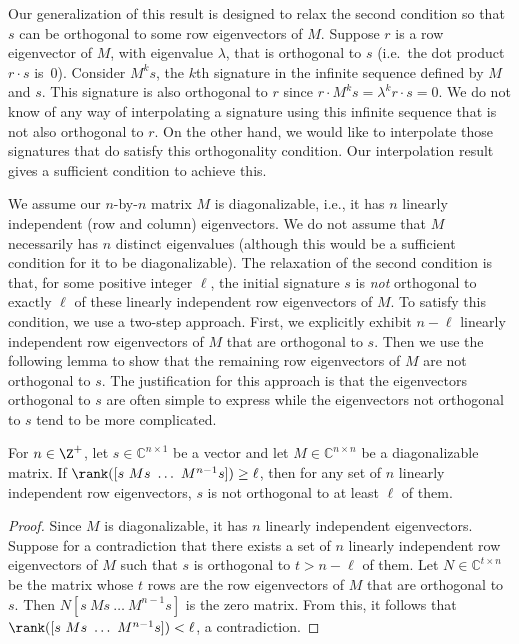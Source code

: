 \documentclass[11pt]{article}
\begin{document}
Our generalization of this result is designed to relax the second condition so that $s$ can be orthogonal to some row eigenvectors of $M$.
Suppose $r$ is a row eigenvector of $M$, with eigenvalue $\lambda$, that is orthogonal to $s$ (i.e.~the dot product $r \cdot s$ is~$0$).
Consider $M^k s$, the $k$th signature in the infinite sequence defined by $M$ and $s$.
This signature is also orthogonal to $r$ since $r \cdot M^k s = \lambda^k r \cdot s = 0$.
We do not know of any way of interpolating a signature using this infinite sequence that is not also orthogonal to $r$.
On the other hand,
we would like to interpolate those signatures that do satisfy this orthogonality condition.
Our interpolation result gives a sufficient condition to achieve this.

We assume our $n$-by-$n$ matrix $M$ is diagonalizable,
i.e., it has $n$ linearly independent (row and column) eigenvectors.
We do not assume that $M$ necessarily has $n$ distinct eigenvalues (although this would be a sufficient condition for it to be diagonalizable).
The relaxation of the second condition is that, for some positive integer $\ell$,
the initial signature $s$ is \emph{not} orthogonal to exactly $\ell$ of these linearly independent row eigenvectors of $M$.
To satisfy this condition,
we use a two-step approach.
First, we explicitly exhibit $n - \ell$ linearly independent row eigenvectors of $M$ that are orthogonal to $s$.
Then we use the following lemma to show that the remaining row eigenvectors of $M$ are not orthogonal to $s$.
The justification for this approach is that the eigenvectors orthogonal to $s$ are often simple to express
while the eigenvectors not orthogonal to $s$ tend to be more complicated.

\begin{lemma} \label{lem:2nd_condition_implication}
 For $n \in \Z^+$,
 let $s \in \mathbb{C}^{n \times 1}$ be a vector and let $M \in \mathbb{C}^{n \times n}$ be a diagonalizable matrix.
 If $\rank([s\ M s\ \ldots\ M^{n-1} s]) \ge \ell$,
 then for any set of $n$ linearly independent row eigenvectors,
 $s$ is not orthogonal to at least $\ell$ of them.
\end{lemma}

\begin{proof}
 Since $M$ is diagonalizable,
 it has $n$ linearly independent eigenvectors.
 Suppose for a contradiction that there exists a set of $n$ linearly independent row eigenvectors of $M$
 such that $s$ is orthogonal to $t > n - \ell$ of them.
 Let $N \in \mathbb{C}^{t \times n}$ be the matrix whose $t$ rows are the row eigenvectors of $M$ that are orthogonal to $s$.
 Then $N [s\ M s\ \ldots\ M^{n-1} s]$ is the zero matrix.
 From this,
 it follows that $\rank([s\ M s\ \ldots\ M^{n-1} s]) < \ell$, a contradiction.
\end{proof}
\end{document}
